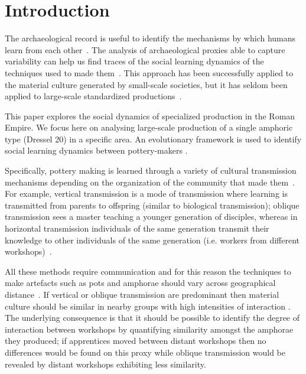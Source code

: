 \documentclass[review]{elsarticle}
\begin{document}
\linenumbers

\section{Introduction}

The archaeological record is useful to identify the mechanisms by which humans learn from each other~\citep{richerson2005not,eerkens_jelmer_cultural_2007}. The analysis of archaeological proxies able to capture variability can help us find traces of the social learning dynamics of the techniques used to made them~\citep{shennan_ceramic_2001,eerkens_jelmer_cultural_2005, gandon_copying_2014}. This approach has been successfully applied to the material culture generated by small-scale societies, but it has seldom been applied to large-scale standardized productions~\citep{shennan_isolation-by-distance_2015}.

This paper explores the social dynamics of specialized production in the Roman Empire. We focus here on analysing large-scale production of a single amphoric type (Dressel 20) in a specific area. An evolutionary framework is used to identify social learning dynamics between pottery-makers \citep{shennan_evolution_2008,mesoudi_cultural_2015}. 

Specifically, pottery making is learned through a variety of cultural transmission mechanisms depending on the organization of the community that made them~\citep{neff1992ceramics,shennan_genes_2002,bowser_learning_2008,hosfield_modes_2009}. For example, vertical transmission is a mode of transmission where learning is transmitted from parents to offspring (similar to biological transmission); oblique transmission sees a master teaching a younger generation of disciples, whereas in horizontal transmission individuals of the same generation transmit their knowledge to other individuals of the same generation (i.e. workers from different workshops)~\citep{cavalli-sforza_cultural_1981, acerbi_cultural_2006}.

All these methods require communication and for this reason the techniques to make artefacts such as pots and amphorae should vary across geographical distance~\citep{bjorklund_effect_2010,shennan_isolation-by-distance_2015, van_strien_isolation-by-distance_2015}. If vertical or oblique transmission are predominant then material culture should be similar in nearby groups with high intensities of interaction \citep{hart_effects_2012}. The underlying consequence is that it should be possible to identify the degree of interaction between workshops by quantifying similarity amongst the amphorae they produced; if apprentices moved between distant workshops then no differences would be found on this proxy while oblique transmission would be revealed by distant workshops exhibiting less similarity.
\end{document}

